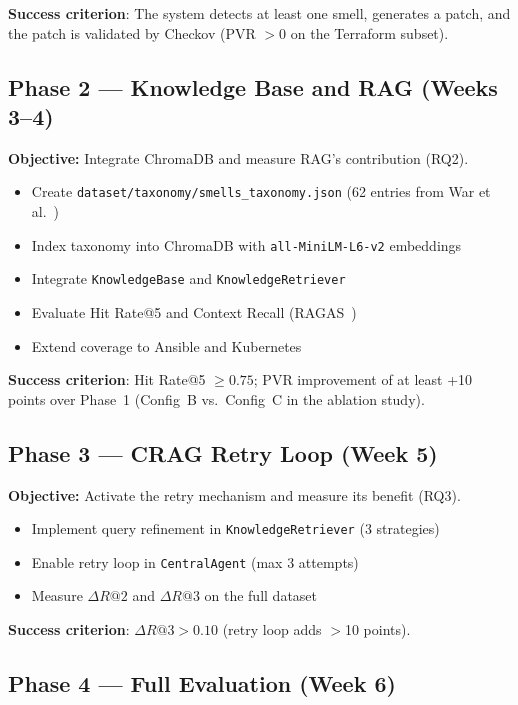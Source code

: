 \documentclass[12pt, a4paper]{report}
\begin{document}
\textbf{Success criterion}: The system detects at least one smell, generates a patch,
and the patch is validated by Checkov (PVR $> 0$ on the Terraform subset).

\subsection{Phase 2 --- Knowledge Base and RAG (Weeks 3--4)}

\textbf{Objective:} Integrate ChromaDB and measure RAG's contribution (RQ2).

\begin{itemize}
  \item Create {\small\texttt{dataset/taxonomy/smells\_taxonomy.json}} (62 entries from
        War et al.~\citep{war2025taxonomy})
  \item Index taxonomy into ChromaDB with \texttt{all-MiniLM-L6-v2} embeddings
  \item Integrate \texttt{KnowledgeBase} and \texttt{KnowledgeRetriever}
  \item Evaluate Hit Rate@5 and Context Recall (RAGAS~\citep{es2024ragas})
  \item Extend coverage to Ansible and Kubernetes
\end{itemize}

\textbf{Success criterion}: Hit Rate@5 $\geq 0.75$; PVR improvement of at least
+10 points over Phase~1 (Config~B vs.\ Config~C in the ablation study).

\subsection{Phase 3 --- CRAG Retry Loop (Week 5)}

\textbf{Objective:} Activate the retry mechanism and measure its benefit (RQ3).

\begin{itemize}
  \item Implement query refinement in \texttt{KnowledgeRetriever} (3 strategies)
  \item Enable retry loop in \texttt{CentralAgent} (max 3 attempts)
  \item Measure $\Delta R@2$ and $\Delta R@3$ on the full dataset
\end{itemize}

\textbf{Success criterion}: $\Delta R@3 > 0.10$ (retry loop adds $>$10 points).

\subsection{Phase 4 --- Full Evaluation (Week 6)}
\end{document}
